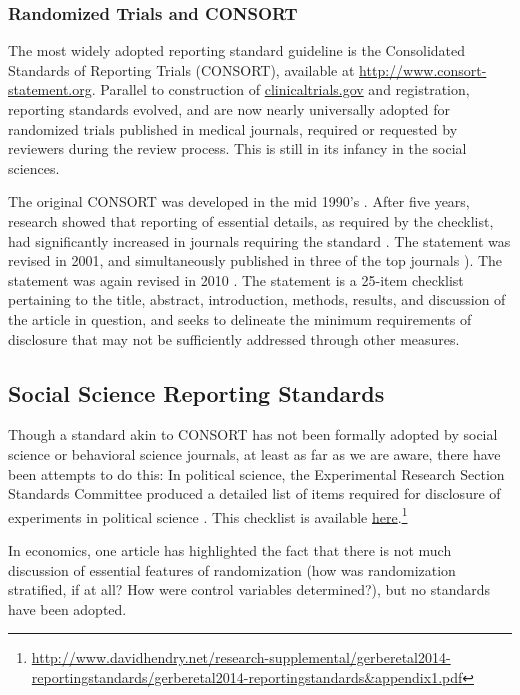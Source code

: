 \documentclass[12pt] {article}
\begin{document}
\subsubsection{Randomized Trials and CONSORT}\label{randomized-trials}
The most widely adopted reporting standard guideline is the Consolidated Standards of Reporting Trials (CONSORT), available at \url{http://www.consort-statement.org}. Parallel to construction of \href{http://clinicaltrials.gov}{clinicaltrials.gov} and registration,
reporting standards evolved, and are now nearly universally adopted for randomized trials published in medical journals, required or requested by reviewers during the review process. This is still in its infancy in the social sciences.

The original CONSORT  was developed in the mid 1990's \citep{begg_c_improving_1996}. After five years, research showed that reporting of essential details, as required by the checklist, had significantly increased in journals requiring the standard  \citep{moher_d_use_2001}. The statement was revised in 2001, and simultaneously published in three of the top journals \citep{moher_consort_2001}). The statement was again revised in 2010 \citep{schulz_consort_2010}. The statement is a 25-item checklist pertaining to the title, abstract, introduction, methods, results, and discussion of the article in question, and seeks to delineate the minimum requirements of disclosure that may not be sufficiently addressed through other measures.

\subsection{Social Science Reporting Standards}\label{soc-sci-standards}
Though a standard akin to CONSORT has not been formally adopted by social science or behavioral science journals, at least as far as we are aware, there have been attempts to do this: In political science, the Experimental Research Section Standards Committee produced a detailed list of items required for disclosure of experiments in political science \citep{gerber_reporting_????}. This checklist is available \href{http://www.davidhendry.net/research-supplemental/gerberetal2014-reportingstandards/gerberetal2014-reportingstandards&appendix1.pdf}{here}.\footnote{\url{http://www.davidhendry.net/research-supplemental/gerberetal2014-reportingstandards/gerberetal2014-reportingstandards&appendix1.pdf}}

In economics, one article has highlighted the fact that there is not much discussion of essential features of randomization (how was randomization stratified, if at all? How were control variables determined?), but no standards have been adopted. \citep{bruhn_pursuit_2009}
\end{document}
